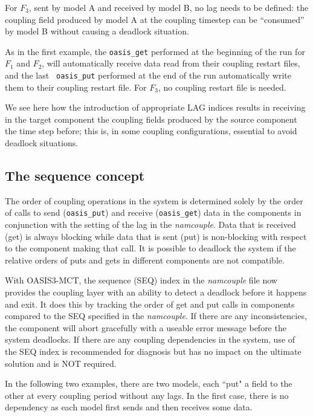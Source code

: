 \begin{enumerate}
  For $F_3$, sent by model A and received by model B, no lag needs to
  be defined: the coupling field produced by model A at the coupling
  timestep can be ``consumed'' by model B without causing a deadlock
  situation.

  As in the first example, the {\tt oasis\_get} performed at the
  beginning of the run for $F_1$ and $F_2$, will automatically receive
  data read from their coupling restart files, and the last {\tt
    oasis\_put} performed at the end of the run automatically write
  them to their coupling restart file. For $F_3$, no coupling restart
  file is needed.

  We see here how the introduction of appropriate LAG indices results
  in receiving in the target component the coupling fields produced by the
  source component the time step before; this is, in some coupling
  configurations, essential to avoid deadlock situations.

\end{enumerate}

\vspace{-0.3cm}
\subsection{The sequence concept}
\label{subsec_sec}

The order of coupling operations in the system is determined solely by
the order of calls to send ({\tt oasis\_put}) and receive ({\tt oasis\_get}) data in the components
in conjunction with the setting of the lag in the {\it namcouple}.
Data that is received (get) is always blocking while data that is sent
(put) is non-blocking with respect to the component making that call.  It
is possible to deadlock the system if the relative orders of puts and
gets in different components are not compatible.

With OASIS3-MCT, the sequence (SEQ) index in the {\it namcouple} file
now provides the coupling layer with an ability to detect a deadlock
before it happens and exit.  It does this by tracking the order of get
and put calls in components compared to the SEQ specified in the {\it
  namcouple}.  If there are any inconsistencies, the component will abort
gracefully with a useable error message before the system deadlocks.
If there are any coupling dependencies in the system, use of the SEQ
index is recommended for diagnosis but has no impact on the ultimate
solution and is NOT required.

In the following two examples, there are two
models, each ``put" a field to the other at every coupling period
without any lags.  In the first case, there is no dependency as each
model first sends and then receives some data.

